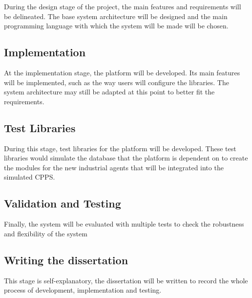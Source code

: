 During the design stage of the project, the main features and requirements will be delineated. The base system architecture will be designed and the main programming language with which the system will be made will be chosen.

\subsection{Implementation}

At the implementation stage, the platform will be developed. Its main features will be implemented, such as the way users will configure the libraries. The system architecture may still be adapted at this point to better fit the requirements.

\subsection{Test Libraries}

During this stage, test libraries for the platform will be developed. These test libraries would simulate the database that the platform is dependent on to create the modules for the new industrial agents that will be integrated into the simulated \gls{CPPS}. 

\subsection{Validation and Testing}

Finally, the system will be evaluated with multiple tests to check the robustness and flexibility of the system

\subsection{Writing the dissertation}

This stage is self-explanatory, the dissertation will be written to record the whole process of development, implementation and testing.\\